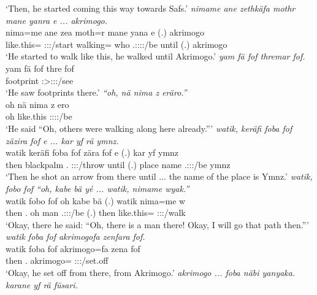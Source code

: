 \begin{exe}
	\trans `Then, he started coming this way towards Safs.'
	\emph{nimame ane zethkäfa mothr mane yanra e ... akrimogo.}\\
	\gll nima=me ane zea moth=r mane yana e (.) akrimogo\\ 
	like.this={\Ins} {\Dem} \Sg:\Sbj:\Pst:\Pfv/start walking={\Purp} who \Tsg.\Masc:\Sbj:\Pst:\Ipfv:\Venit/be until (.) akrimogo\\
	\trans `He started to walk like this, he walked until Akrimogo.'
	\emph{yam fä fof thremar fof.}\\
	\gll yam fä fof thre fof\\ 
	footprint {\Dist} {\Emph} \Stsg:\Sbj>\Stpl:\Obj:\Irr:\Pfv/see {\Emph}\\
	\trans `He saw footprints there.'
	\emph{``oh, nä nima z eräro.''}\\
	\gll oh nä nima z ero\\ 
	oh {\Indf} like.this {\Iam} \Stpl:\Sbj:\Nonpast:\Ipfv:\Andat/be\\
	\trans `He said ``Oh, others were walking along here already.'''
  \newpage 
{} 
	\emph{watik, keräfi foba fof zäzira fof e ... kar yf rä ymnz.}\\
	\gll watik keräfi foba fof zära fof e (.) kar yf  ymnz\\ 
	then blackpalm \Dist.{\Abl} {\Emph} \Sg:\Sbj:\Pst:\Pfv/throw {\Emph} until (.) place name \Tsg.\F:\Sbj:\Nonpast:\Ipfv/be ymnz\\
	\trans `Then he shot an arrow from there until ... the name of the place is Ymnz.'
	\emph{watik, fobo fof ``oh, kabe bä yé ... watik, nimame wyak.''}\\
	\gll watik fobo fof oh kabe bä  (.) watik nima=me w\\ 
	then \Dist.{\All} {\Emph} oh man \Med{} \Tsg.\Masc:\Sbj:\Nonpast:\Ipfv/be (.) then like.this={\Ins} \Fsg:\Sbj:\Nonpast:\Ipfv/walk\\
	\trans `Okay, there he said: ``Oh, there is a man there! Okay, I will go that path then.'''
	\emph{watik foba fof akrimogofa zenfara fof.}\\
	\gll watik foba fof akrimogo=fa zena fof\\ 
	then \Dist.{\Abl} {\Emph} akrimogo={\Abl} \Sg:\Sbj:\Pst:\Pfv/set.off {\Emph}\\
	\trans `Okay, he set off from there, from Akrimogo.'
	\emph{akrimogo ... foba näbi yanyaka. karane yf rä füsari.}\\

\end{exe}
